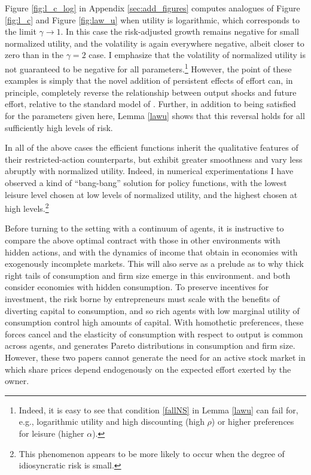 \documentclass[11pt]{article}
\theoremstyle{plain}
\begin{document}
Figure \ref{fig:l_c_log} in Appendix \ref{sec:add_figures} computes analogues of Figure \ref{fig:l_c} and Figure \ref{fig:law_u} when utility is logarithmic, which corresponds to the limit $\gamma \rightarrow 1$. In this case the risk-adjusted growth remains negative for small normalized utility, and the volatility is again everywhere negative, albeit closer to zero than in the $\gamma=2$ case. I emphasize that the volatility of normalized utility is not guaranteed to be negative for all parameters.\footnote{Indeed, it is easy to see that condition \eqref{fallNS} in Lemma \ref{lawu} can fail for, e.g., logarithmic utility and high discounting (high $\rho$) or higher preferences for leisure (higher $\alpha$).} However, the point of these examples is simply that the novel addition of persistent effects of effort can, in principle, completely reverse the relationship between output shocks and future effort, relative to the standard model of \cite{sannikov_continuous-time_2008}. Further, in addition to being satisfied for the parameters given here, Lemma \ref{lawu} shows that this reversal holds for all sufficiently high levels of risk. 

In all of the above cases the efficient functions inherit the qualitative features of their restricted-action counterparts, but exhibit greater smoothness and vary less abruptly with normalized utility. Indeed, in numerical experimentations I have observed a kind of ``bang-bang'' solution for policy functions, with the lowest leisure level chosen at low levels of normalized utility, and the highest chosen at high levels.\footnote{This phenomenon appears to be more likely to occur when the degree of idiosyncratic risk is small.}

Before turning to the setting with a continuum of agents, it is instructive to compare the above optimal contract with those in other environments with hidden actions, and with the dynamics of income that obtain in economies with exogenously incomplete markets. This will also serve as a prelude as to why thick right tails of consumption and firm size emerge in this environment. \cite{shourideh_optimal_2013} and \cite{phelan_optimality_2022} both consider economies with hidden consumption. To preserve incentives for investment, the risk borne by entrepreneurs must scale with the benefits of diverting capital to consumption, and so rich agents with low marginal utility of consumption control high amounts of capital. With homothetic preferences, these forces cancel and the elasticity of consumption with respect to output is common across agents, and generates Pareto distributions in consumption and firm size. However, these two papers cannot generate the need for an active stock market in which share prices depend endogenously on the expected effort exerted by the owner.
\end{document}
